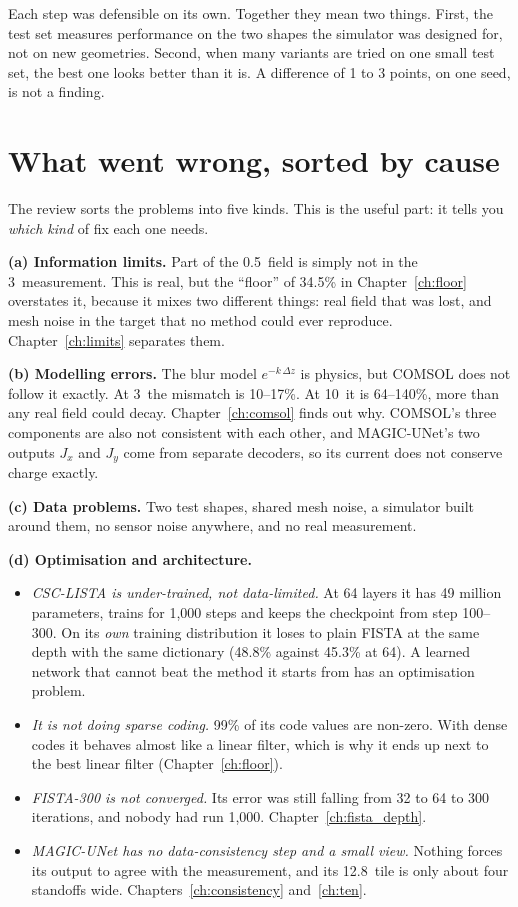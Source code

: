 \begin{careful}
Each step was defensible on its own. Together they mean two things. First, the test set measures performance on the two
shapes the simulator was designed for, not on new geometries. Second, when many variants are tried on one small test
set, the best one looks better than it is. A difference of 1 to 3 points, on one seed, is not a finding.
\end{careful}

\section{What went wrong, sorted by cause}

The review sorts the problems into five kinds. This is the useful part: it tells you \emph{which kind} of fix each one
needs.

\textbf{(a) Information limits.} Part of the 0.5\um\ field is simply not in the 3\um\ measurement. This is real, but the
``floor'' of 34.5\% in Chapter~\ref{ch:floor} overstates it, because it mixes two different things: real field that was
lost, and mesh noise in the target that no method could ever reproduce. Chapter~\ref{ch:limits} separates them.

\textbf{(b) Modelling errors.} The blur model $e^{-k\,\Delta z}$ is physics, but COMSOL does not follow it exactly. At
3\um\ the mismatch is 10--17\%. At 10\um\ it is 64--140\%, more than any real field could decay. Chapter~\ref{ch:comsol}
finds out why. COMSOL's three components are also not consistent with each other, and MAGIC-UNet's two outputs $J_x$ and
$J_y$ come from separate decoders, so its current does not conserve charge exactly.

\textbf{(c) Data problems.} Two test shapes, shared mesh noise, a simulator built around them, no sensor noise anywhere,
and no real measurement.

\textbf{(d) Optimisation and architecture.}
\begin{itemize}
\item \emph{CSC-LISTA is under-trained, not data-limited.} At 64 layers it has 49 million parameters, trains for 1{,}000
steps and keeps the checkpoint from step 100--300. On its \emph{own} training distribution it loses to plain FISTA at the
same depth with the same dictionary (48.8\% against 45.3\% at 64). A learned network that cannot beat the method it
starts from has an optimisation problem.
\item \emph{It is not doing sparse coding.} 99\% of its code values are non-zero. With dense codes it behaves almost like a
linear filter, which is why it ends up next to the best linear filter (Chapter~\ref{ch:floor}).
\item \emph{FISTA-300 is not converged.} Its error was still falling from 32 to 64 to 300 iterations, and nobody had run
1{,}000. Chapter~\ref{ch:fista_depth}.
\item \emph{MAGIC-UNet has no data-consistency step and a small view.} Nothing forces its output to agree with the
measurement, and its 12.8\um\ tile is only about four standoffs wide. Chapters~\ref{ch:consistency} and~\ref{ch:ten}.
\end{itemize}

